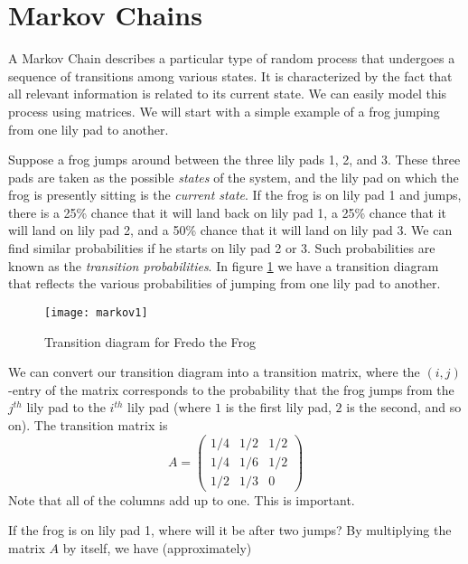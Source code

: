 \label{lab:MarkovGraph}

\section*{Markov Chains}
A Markov Chain describes a particular type of random process that
undergoes a sequence of transitions among various states. It is
characterized by the fact that all relevant information is related to its current state.
We can easily model this process using matrices.
We will start with a simple example of a frog jumping from one lily pad to another.

Suppose a frog jumps around between the three lily pads 1, 2, and 3.
These three pads are taken as the possible \emph{states} of the system, and the
lily pad on which the frog is presently sitting is the \emph{current state}.
If the frog is on lily pad 1 and jumps, there is a 25\% chance that it will land back on lily pad 1, a 25\% chance that it will land on lily pad 2, and a 50\% chance that it will land on lily pad 3.
We can find similar probabilities if he starts on lily pad 2 or 3.
Such probabilities are known as the \emph{transition probabilities}.
In figure \ref{fig:markov1} we have a transition diagram that reflects the various probabilities of jumping from one lily pad to another.

\begin{figure}[h]
\texttt{[image: markov1]}
\caption{Transition diagram for Fredo the Frog}
\label{fig:markov1}
\end{figure}

We can convert our transition diagram into a transition matrix, where the $(i,j)$-entry of the matrix corresponds to the probability that the frog jumps from the $j^{th}$ lily pad to the $i^{th}$ lily pad (where $1$ is the first lily pad, $2$ is the second, and so on).
The transition matrix is
\[
A = \begin{pmatrix}
1/4 & 1/2 & 1/2\\
1/4 & 1/6 & 1/2\\
1/2 & 1/3 & 0
\end{pmatrix}
\]
Note that all of the columns add up to one.
This is important.

If the frog is on lily pad 1, where will it be after two jumps?
By multiplying the matrix $A$ by itself, we have (approximately)

